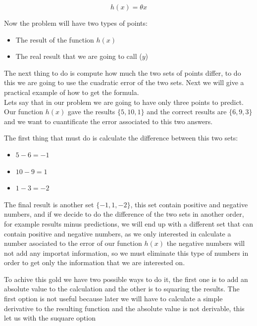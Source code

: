\documentclass[12pt,journal]{IEEEtran}
\begin{document}
    \begin{equation}
        h(x) = \theta x
    \end{equation}

    Now the problem will have two types of points: \\

    \begin{itemize}
        \item The result of the function $h(x)$
        \item The real result that we are going to call ($y$) \\
    \end{itemize}

    The next thing to do is compute how much the two sets of points differ, to
    do this we are going to use the cuadratic error of the two sets. Next we
    will give a practical example of how to get the formula. \\

    Lets say that in our problem we are going to have only three points to
    predict. Our function $h(x)$ gave the results $\{5,10,1\}$ and the correct
    results are $\{6,9,3\}$ and we want to cuantificate the error associated to
    this two answers.

    The first thing that must do is calculate the difference between this two
    sets:\\

    \begin{itemize}
        \item $5-6 = -1$
        \item $10-9 = 1$
        \item $1-3 = -2$ \\
    \end{itemize}

    The final result is another set $\{-1,1,-2\}$, this set contain positive and
    negative numbers, and if we decide to do the difference of the two sets in
    another order, for example results minus predictions, we will end up with a
    different set that can contain positive and negative numbers, as we only
    interested in calculate a number asociated to the error of our function
    $h(x)$ the negative numbers will not add any importat information, so we
    must eliminate this type of numbers in order to get only the information
    that we are interested on.

    To achive this gold we have two possible ways to do it, the first one is to
    add an absolute value to the calculation and the other is to squaring the
    results. The first option is not useful because later we will have to
    calculate a simple derivative to the resulting function and the absolute
    value is not derivable, this let us with the suquare option\\
\end{document}
